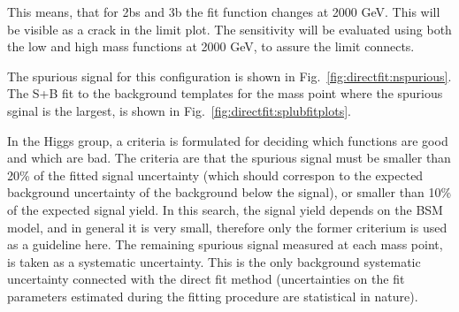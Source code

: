 This means, that for 2bs and 3b the fit function changes at 2000 GeV. This will be visible as a crack in the limit plot. The sensitivity will be evaluated using both the low and high mass functions at 2000 GeV, to assure the limit connects.

The spurious signal for this configuration is shown in Fig.~\ref{fig:directfit:nspurious}. The S+B fit to the background templates for the mass point where the spurious sginal is the largest, is shown in Fig.~\ref{fig:directfit:splubfitplots}.

In the Higgs group, a criteria is formulated for deciding which functions are good and which are bad. The criteria are that the spurious signal must be smaller than 20\% of the fitted signal uncertainty (which should correspon to the expected background uncertainty of the background below the signal), or smaller than 10\% of the expected signal yield. In this search, the signal yield depends on the BSM model, and in general it is very small, therefore only the former criterium is used as a guideline here. The remaining spurious signal measured at each mass point, is taken as a systematic uncertainty. This is the only background systematic uncertainty connected with the direct fit method (uncertainties on the fit parameters estimated during the fitting procedure are statistical in nature).

